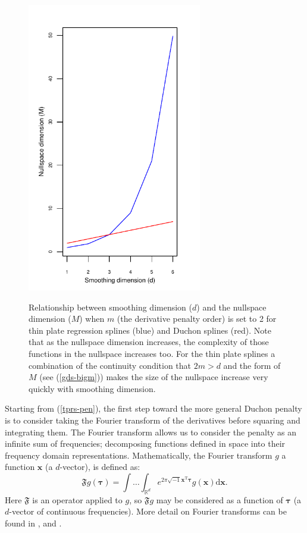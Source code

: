 \begin{figure}
\centering
\includegraphics[width=3in]{gds/figs/nullspace-dim.pdf} \\
\caption{Relationship between smoothing dimension ($d$) and the nullspace dimension ($M$) when $m$ (the derivative penalty order) is set to 2 for thin plate regression splines (blue) and Duchon splines (red). Note that as the nullspace dimension increases, the complexity of those functions in the nullspace increases too. For the thin plate splines a combination of the continuity condition that $2m>d$ and the form of $M$ (see (\ref{gds-bigm})) makes the size of the nullspace increase very quickly with smoothing dimension.}
\label{nullspace-dim}
\end{figure}

Starting from (\ref{tprs-pen}), the first step toward the more general Duchon penalty is to consider taking the Fourier transform of the derivatives before squaring and integrating them. The Fourier transform allows us to consider the penalty as an infinite sum of frequencies; decomposing functions defined in space into their frequency domain representations. Mathematically, the Fourier transform $g$ a function $\mathbf{x}$ (a $d$-vector), is defined as:
\begin{equation*}
\mathfrak{F} g(\boldsymbol{\tau}) = \int \ldots \int_{\mathbb{R}^d} e^{2 \pi \sqrt{-1} \mathbf{x}^\text{T} \boldsymbol{\tau}} g(\mathbf{x}) \text{d}\mathbf{x}.
\end{equation*}
Here $\mathfrak{F}$ is an operator applied to $g$, so $\mathfrak{F}g$ may be considered as a function of $\boldsymbol{\tau}$ (a $d$-vector of continuous frequencies). More detail on Fourier transforms can be found in ,  and . 

